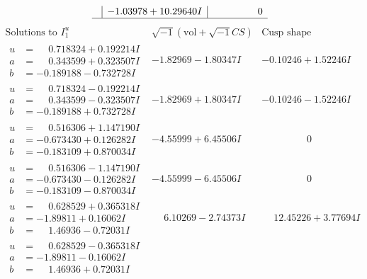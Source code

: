 \documentclass[1p]{elsarticle_modified}
\theoremstyle{definition}
\newcommand{\I}{\sqrt{-1}}
\begin{document}
$$\begin{array}{c|c|c}
 & -1.03978 + 10.29640 I & \phantom{-0.000000 } 0\\
 \hline 
 \end{array}$$\newpage$$\begin{array}{c|c|c}  
\text{Solutions to }I^u_{1}& \I (\text{vol} + \sqrt{-1}CS) & \text{Cusp shape}\\
 \hline 
\begin{aligned}
u &= \phantom{-}0.718324 + 0.192214 I \\
a &= \phantom{-}0.343599 + 0.323507 I \\
b &= -0.189188 - 0.732728 I\end{aligned}
 & -1.82969 - 1.80347 I & -0.10246 + 1.52246 I \\ \hline\begin{aligned}
u &= \phantom{-}0.718324 - 0.192214 I \\
a &= \phantom{-}0.343599 - 0.323507 I \\
b &= -0.189188 + 0.732728 I\end{aligned}
 & -1.82969 + 1.80347 I & -0.10246 - 1.52246 I \\ \hline\begin{aligned}
u &= \phantom{-}0.516306 + 1.147190 I \\
a &= -0.673430 + 0.126282 I \\
b &= -0.183109 + 0.870034 I\end{aligned}
 & -4.55999 + 6.45506 I & \phantom{-0.000000 } 0 \\ \hline\begin{aligned}
u &= \phantom{-}0.516306 - 1.147190 I \\
a &= -0.673430 - 0.126282 I \\
b &= -0.183109 - 0.870034 I\end{aligned}
 & -4.55999 - 6.45506 I & \phantom{-0.000000 } 0 \\ \hline\begin{aligned}
u &= \phantom{-}0.628529 + 0.365318 I \\
a &= -1.89811 + 0.16062 I \\
b &= \phantom{-}1.46936 - 0.72031 I\end{aligned}
 & \phantom{-}6.10269 - 2.74373 I & \phantom{-}12.45226 + 3.77694 I \\ \hline\begin{aligned}
u &= \phantom{-}0.628529 - 0.365318 I \\
a &= -1.89811 - 0.16062 I \\
b &= \phantom{-}1.46936 + 0.72031 I\end{aligned}

\end{array}$$
\end{document}
